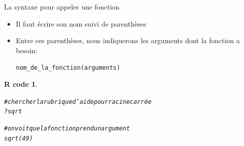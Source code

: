 \documentclass[11pt]{beamer}\usepackage[]{graphicx}\usepackage[]{color}
\makeatletter
\newcommand{\hlnum}[1]{\textcolor[rgb]{0.063,0.58,0.627}{#1}}%
\newcommand{\hlcom}[1]{\textcolor[rgb]{0.588,0.588,0.588}{#1}}%
\newcommand{\hlopt}[1]{\textcolor[rgb]{0.196,0.196,0.196}{#1}}%
\newcommand{\hlstd}[1]{\textcolor[rgb]{0.196,0.196,0.196}{#1}}%
\newcommand{\hlkwd}[1]{\textcolor[rgb]{0.78,0.227,0.412}{#1}}%
\newenvironment{kframe}{%
 \def\at@end@of@kframe{}%
 \ifinner\ifhmode%
  \def\at@end@of@kframe{\end{minipage}}%
  \begin{minipage}{\columnwidth}%
 \fi\fi%
 \def\FrameCommand##1{\hskip\@totalleftmargin \hskip-\fboxsep
 \colorbox{shadecolor}{##1}\hskip-\fboxsep
     \hskip-\linewidth \hskip-\@totalleftmargin \hskip\columnwidth}%
 \MakeFramed {\advance\hsize-\width
   \@totalleftmargin\z@ \linewidth\hsize
   \@setminipage}}%
 {\par\unskip\endMakeFramed%
 \at@end@of@kframe}
\newenvironment{knitrout}{}{} %
\newtheorem{rcode}{R code}[section]
\newcommand{\code}[1]{\texttt{#1}}
\makeatother
\begin{document}
\begin{frame}[fragile]{La syntaxe pour appeler une fonction}
\begin{itemize}
 \setlength\itemsep{2em}
\item Il faut écrire son nom suivi de parenthèses
\pause \item Entre ces parenthèses, nous indiquerons les arguments dont la fonction a besoin:
\begin{center}
\code{nom\_de\_la\_fonction(arguments)}
\end{center}
\end{itemize}
\pause 
\begin{knitrout}
\color{fgcolor}\begin{kframe}
\begin{rcode}\label{unnamed-chunk-10}\begin{alltt}
\hlcom{# chercher la rubrique d'aide pour racine carrée}
\hlopt{?}\hlstd{sqrt}

\hlcom{# on voit que la fonction prend un argument}
\hlkwd{sqrt}\hlstd{(}\hlnum{49}\hlstd{)}
\end{alltt}
\end{rcode}\end{kframe}
\end{knitrout}

\end{frame}
\end{document}
